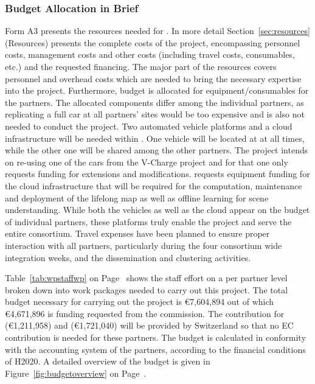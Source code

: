 
\subsubsection{Budget Allocation in Brief}
Form A3 presents the resources needed for \Project. In more detail Section~\ref{sec:resources} (Resources) presents the complete costs of the project, encompassing personnel costs, management costs and other costs (including travel costs, consumables, etc.) and the requested financing. The major part of the resources covers personnel and overhead costs which are needed to bring the necessary expertise into the project. Furthermore, budget is allocated for equipment/consumables for the partners. The allocated components differ among the individual partners, as replicating a full car at all partners' sites would be too expensive and is also not needed to conduct the project. Two automated vehicle platforms and a cloud infrastructure will be needed within \Project{}. One vehicle will be located at \VW{} at all times, while the other one will be shared among the other partners. The project intends on re-using one of the cars from the V-Charge project and for that one \VW{} only requests funding for extensions and modifications. \IBM requests equipment funding for the cloud infrastructure that will be required for the computation, maintenance and deployment of the lifelong map as well as offline learning for scene understanding. While both the vehicles as well as the cloud appear on the budget of individual partners, these platforms truly enable the project and serve the entire consortium. Travel expenses have been planned to ensure proper interaction with all partners, particularly during the four consortium wide integration weeks, and the dissemination and clustering activities.

Table~\ref{tab:wpstaffwp} on Page~\pageref{tab:wpstaffwp} shows the staff effort on a per partner level broken down into work packages needed to carry out this project. The total budget necessary for carrying out the project is \euro 7,604,894 out of which \euro 4,671,896 is funding requested from the commission.  The contribution for \ETHZ{} (\euro 1,211,958) and \IBM{} (\euro 1,721,040) will be provided by Switzerland so that no EC contribution is needed for these partners. The budget is calculated in conformity with the accounting system of the partners, according to the financial conditions of H2020. A detailed overview of the budget is given in Figure~\ref{fig:budgetoverview} on Page~\pageref{fig:budgetoverview}.




